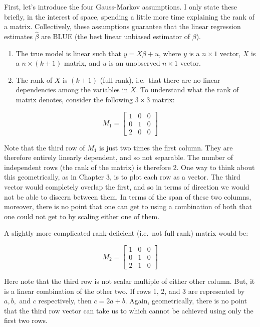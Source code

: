 \documentclass[
]{book}
\begin{document}
First, let's introduce the four Gauss-Markov assumptions. I only state these briefly, in the interest of space, spending a little more time explaining the rank of a matrix. Collectively, these assumptions guarantee that the linear regression estimates \(\hat{\beta}\) are BLUE (the best linear unbiased estimator of \(\beta\)).

\begin{enumerate}
\def\labelenumi{\arabic{enumi}.}
\item
  The true model is linear such that \(y = X\beta + u\), where \(y\) is a \(n \times 1\) vector, \(X\) is a \(n \times (k + 1)\) matrix, and \(u\) is an unobserved \(n \times 1\) vector.
\item
  The rank of \(X\) is \((k+1)\) (full-rank), i.e.~that there are no linear dependencies among the variables in \(X\). To understand what the rank of matrix denotes, consider the following \(3\times 3\) matrix:
\end{enumerate}

\[
  M_1=\begin{bmatrix}
  1 & 0 & 0 \\
  0 & 1 & 0 \\
  2 & 0 & 0
  \end{bmatrix}
  \]

Note that the third row of \(M_1\) is just two times the first column. They are therefore entirely linearly dependent, and so not separable. The number of independent rows (the rank of the matrix) is therefore 2. One way to think about this geometrically, as in \protect\hypertarget{linear_projection}{}{Chapter 3}, is to plot each row as a vector. The third vector would completely overlap the first, and so in terms of direction we would not be able to discern between them. In terms of the span of these two columns, moreover, there is no point that one can get to using a combination of both that one could not get to by scaling either one of them.

A slightly more complicated rank-deficient (i.e.~not full rank) matrix would be:

\[
  M_2=\begin{bmatrix}
  1 & 0 & 0 \\
  0 & 1 & 0 \\
  2 & 1 & 0
  \end{bmatrix}
  \]

Here note that the third row is not scalar multiple of either other column. But, it is a linear combination of the other two. If rows 1, 2, and 3 are represented by \(a, b,\) and \(c\) respectively, then \(c = 2a + b\). Again, geometrically, there is no point that the third row vector can take us to which cannot be achieved using only the first two rows.
\end{document}

